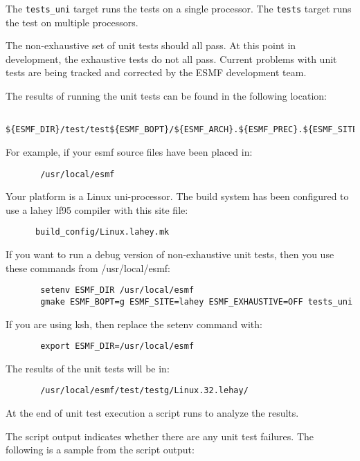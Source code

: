 The {\tt tests\_uni} target runs the tests on a single processor. 
The {\tt tests} target runs the test on multiple processors.

The non-exhaustive set of unit tests should all pass.  At this point in 
development, the exhaustive tests do not all pass.  Current problems with 
unit tests are being tracked and corrected by the ESMF development team.

The results of running the unit tests can be found in the following location:
\begin{verbatim}
       ${ESMF_DIR}/test/test${ESMF_BOPT}/${ESMF_ARCH}.${ESMF_PREC}.${ESMF_SITE}
\end{verbatim}

For example, if your esmf source files have been placed in: 
\begin{verbatim}
       /usr/local/esmf
\end{verbatim}

Your platform is a Linux uni-processor. The build system has been
configured to use a lahey lf95 compiler with this site file:

\begin{verbatim}
      build_config/Linux.lahey.mk
\end{verbatim}

If you want to run a debug version of non-exhaustive unit tests,
then you use these commands from /usr/local/esmf:

\begin{verbatim}
       setenv ESMF_DIR /usr/local/esmf
       gmake ESMF_BOPT=g ESMF_SITE=lahey ESMF_EXHAUSTIVE=OFF tests_uni
\end{verbatim}


If you are using ksh, then replace the setenv command with:
\begin{verbatim}
       export ESMF_DIR=/usr/local/esmf
\end{verbatim}

The results of the unit tests will be in:
\begin{verbatim}
       /usr/local/esmf/test/testg/Linux.32.lehay/
\end{verbatim}

At the end of unit test execution a script runs to analyze the results.

The script output indicates whether there are any unit test failures.
The following is a sample from the script output:

